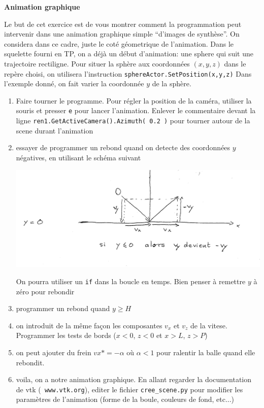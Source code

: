 \documentclass[11pt]{letter}
\begin{document}
\textbf{Animation graphique}

 Le but de cet exercice est de vous montrer comment la programmation peut intervenir dans une animation graphique simple ``d'images de synthèse''.
 On considera dans ce cadre, juste le coté géometrique de l'animation. Dans le squelette fourni en TP, on a déjà un début d'animation: 
 une sphere qui suit une trajectoire rectiligne. 
 Pour situer la sphère aux coordonnées $(x,y,z)$ dans le repère choisi, on utilisera l'instruction \texttt{sphereActor.SetPosition(x,y,z)}
 Dans l'exemple donné, on fait varier la coordonnée $y$ de la sphère. 

 \begin{enumerate} 
 
    \item Faire tourner le programme. Pour régler la position de la caméra, utiliser
    la souris et presser \texttt{e} pour lancer l'animation. Enlever le commentaire devant la ligne
    \texttt{ren1.GetActiveCamera().Azimuth( 0.2 )} pour tourner autour de la scene durant l'animation
    \item essayer de programmer un rebond quand on detecte des coordonnées $y$ négatives, en utilisant le schéma suivant 
   \begin{center}
     \includegraphics[width=0.8\linewidth]{rebond.pdf}
   \end{center}
   On pourra utiliser un \texttt{if} dans la boucle en temps. Bien penser à remettre $y$ à zéro pour rebondir
   \item programmer un rebond quand $y \geqslant H$
   \item on introduit de la même façon les composantes $v_x$ et $v_z$ de la vitese. Programmer les tests de bords ($x <0$, $z < 0$ et $x > L$, $z > P$)
   \item on peut ajouter du frein $vx *= -\alpha$ où $\alpha < 1$ pour ralentir la balle quand elle rebondit.
   \item voila, on a notre animation graphique. En allant regarder la documentation de vtk (\texttt{ www.vtk.org}), editer le fichier \texttt{cree\_scene.py}
   pour modifier les paramètres de l'animation (forme de la boule, couleurs de fond, etc...)
    
  \end{enumerate}
\end{document}
